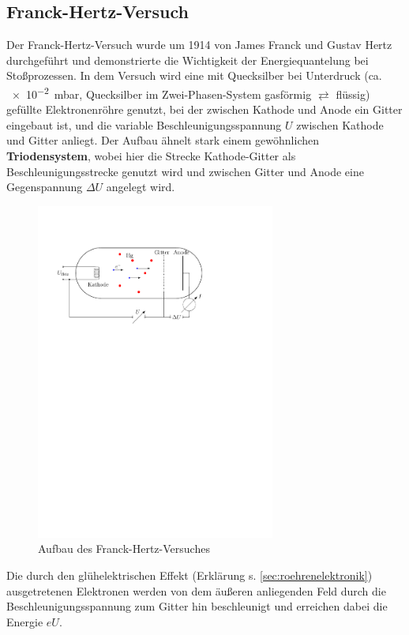 \documentclass[11pt, a4paper]{article}
\begin{document}
\subsection{Franck-Hertz-Versuch}

Der Franck-Hertz-Versuch wurde um 1914 von James Franck und Gustav Hertz \cite{demtroeder3} durchgeführt und demonstrierte die Wichtigkeit der Energiequantelung bei Stoßprozessen.
In dem Versuch wird eine mit Quecksilber bei Unterdruck (ca. \SI{e-2}{\milli\bar}, Quecksilber im Zwei-Phasen-System gasförmig $\rightleftarrows$ flüssig) gefüllte Elektronenröhre genutzt, bei der zwischen Kathode und Anode ein Gitter eingebaut ist, und die variable Beschleunigungsspannung $U$ zwischen Kathode und Gitter anliegt.
Der Aufbau ähnelt stark einem gewöhnlichen \textbf{Triodensystem}, wobei hier die Strecke Kathode-Gitter als Beschleunigungsstrecke genutzt wird und zwischen Gitter und Anode eine Gegenspannung $\Delta U$ angelegt wird.
\begin{figure}[h]
\centering
\includegraphics[width=0.7\textwidth]{./figures/franck-hertz_aufbau.pdf}
\caption{Aufbau des Franck-Hertz-Versuches}
\label{fig:franck-hertz_aufbau}
\end{figure}
Die durch den glühelektrischen Effekt (Erklärung s. \ref{sec:roehrenelektronik}) ausgetretenen Elektronen werden von dem äußeren anliegenden Feld durch die Beschleunigungsspannung zum Gitter hin beschleunigt und erreichen dabei die Energie $eU$.
\end{document}
